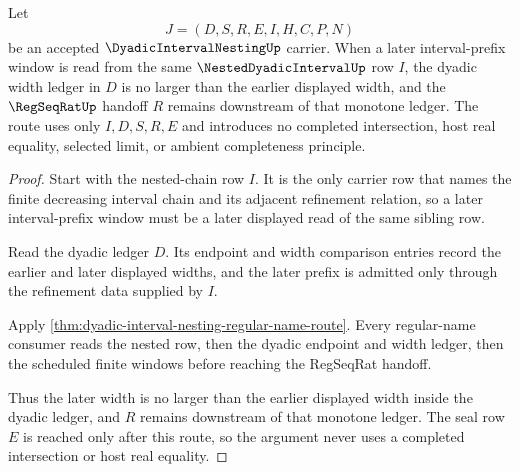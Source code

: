 \begin{theorem}\label{thm:dyadic-interval-nesting-width-monotonicity}
Let
$$
J=(D,S,R,E,I,H,C,P,N)
$$
be an accepted $\DyadicIntervalNestingUp$ carrier. When a later interval-prefix window is read from the same $\NestedDyadicIntervalUp$ row $I$, the dyadic width ledger in $D$ is no larger than the earlier displayed width, and the $\RegSeqRatUp$ handoff $R$ remains downstream of that monotone ledger. The route uses only $I,D,S,R,E$ and introduces no completed intersection, host real equality, selected limit, or ambient completeness principle.
\end{theorem}
\begin{proof}
Start with the nested-chain row $I$. It is the only carrier row that names the finite decreasing interval chain and its adjacent refinement relation, so a later interval-prefix window must be a later displayed read of the same sibling row.

Read the dyadic ledger $D$. Its endpoint and width comparison entries record the earlier and later displayed widths, and the later prefix is admitted only through the refinement data supplied by $I$.

Apply \autoref{thm:dyadic-interval-nesting-regular-name-route}. Every regular-name consumer reads the nested row, then the dyadic endpoint and width ledger, then the scheduled finite windows before reaching the RegSeqRat handoff.

Thus the later width is no larger than the earlier displayed width inside the dyadic ledger, and $R$ remains downstream of that monotone ledger. The seal row $E$ is reached only after this route, so the argument never uses a completed intersection or host real equality.
\end{proof}

